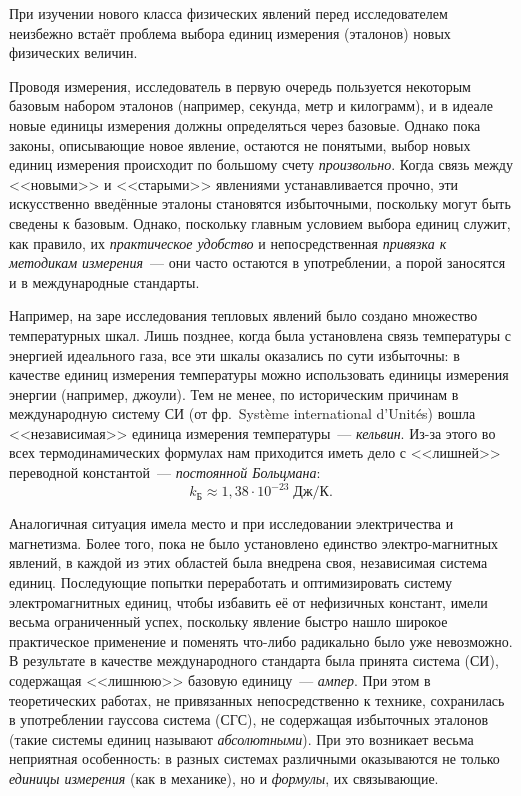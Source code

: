 \label{sec:app_units}

При изучении нового класса физических явлений перед исследователем
неизбежно встаёт проблема выбора единиц измерения (эталонов) новых
физических величин.

Проводя измерения, исследователь в первую очередь пользуется некоторым
базовым набором эталонов (например, секунда, метр и килограмм), и
в идеале новые единицы измерения должны определяться через базовые.
Однако пока законы, описывающие новое явление, остаются не понятыми,
выбор новых единиц измерения происходит по большому счету \emph{произвольно}.
Когда связь между <<новыми>> и <<старыми>>
явлениями устанавливается прочно, эти искусственно введённые эталоны
становятся избыточными, поскольку могут быть сведены к базовым. Однако,
поскольку главным условием выбора единиц служит, как правило,
их \emph{практическое удобство} и непосредственная
\emph{привязка к методикам измерения}~--- они часто остаются в употреблении,
а порой заносятся и в международные стандарты.

Например, на заре исследования тепловых явлений было создано множество
температурных шкал. Лишь позднее, когда была установлена связь температуры
с энергией идеального газа, все эти шкалы оказались по сути избыточны:
в качестве единиц измерения температуры можно использовать единицы
измерения энергии (например, джоули). Тем не менее, по историческим
причинам в международную систему СИ (от фр.~Système international d’Unités) вошла <<независимая>>
единица измерения температуры~--- \emph{кельвин}. Из-за этого во
всех термодинамических формулах нам приходится иметь дело с <<лишней>>
переводной константой~--- \emph{постоянной Больцмана}:
\[
k_{\text{Б}}\approx 1{,}38\cdot10^{-23}\;\text{Дж}/\text{К}.
\]

Аналогичная ситуация имела место и при исследовании электричества
и магнетизма. Более того, пока не было установлено единство электро-магнитных
явлений, в каждой из этих областей была внедрена своя, независимая
система единиц. Последующие попытки переработать и оптимизировать
систему электромагнитных единиц, чтобы избавить её от нефизичных
констант, имели весьма ограниченный успех, поскольку явление быстро
нашло широкое практическое применение и поменять что-либо радикально
было уже невозможно. В результате в качестве международного стандарта
была принята система (СИ), содержащая <<лишнюю>>
базовую единицу~--- \emph{ампер}. При этом в теоретических работах,
не привязанных непосредственно к технике, сохранилась в употреблении
гауссова система (СГС), не содержащая избыточных эталонов (такие системы
единиц называют \emph{абсолютными}). При это возникает весьма неприятная
особенность: в разных системах различными оказываются не только \emph{единицы
измерения} (как в механике), но и \emph{формулы}, их связывающие.

